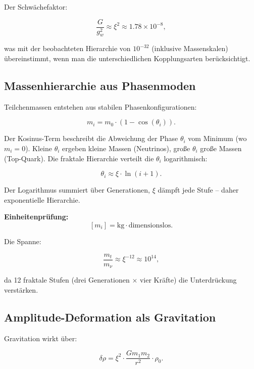 	Der Schwächefaktor:
	
	\begin{equation}
		\frac{G}{g_w^2} \approx \xi^2 \approx 1.78 \times 10^{-8},
	\end{equation}
	
	was mit der beobachteten Hierarchie von \(10^{-32}\) (inklusive Massenskalen) übereinstimmt, wenn man die unterschiedlichen Kopplungsarten berücksichtigt.
	
	\subsection*{Massenhierarchie aus Phasenmoden}
	
	Teilchenmassen entstehen aus stabilen Phasenkonfigurationen:
	
	\begin{equation}
		m_i = m_0 \cdot (1 - \cos(\theta_i)).
	\end{equation}
	
	Der Kosinus-Term beschreibt die Abweichung der Phase \(\theta_i\) vom Minimum (wo \(m_i = 0\)). Kleine \(\theta_i\) ergeben kleine Massen (Neutrinos), große \(\theta_i\) große Massen (Top-Quark). Die fraktale Hierarchie verteilt die \(\theta_i\) logarithmisch:
	
	\begin{equation}
		\theta_i \approx \xi \cdot \ln(i + 1).
	\end{equation}
	
	Der Logarithmus summiert über Generationen, \(\xi\) dämpft jede Stufe – daher exponentielle Hierarchie.
	
	\textbf{Einheitenprüfung:}
	\[
	[m_i] = \si{\kilo\gram} \cdot \text{dimensionslos}.
	\]
	
	Die Spanne:
	
	\begin{equation}
		\frac{m_t}{m_\nu} \approx \xi^{-12} \approx 10^{14},
	\end{equation}
	
	da 12 fraktale Stufen (drei Generationen × vier Kräfte) die Unterdrückung verstärken.
	
	\subsection*{Amplitude-Deformation als Gravitation}
	
	Gravitation wirkt über:
	
	\begin{equation}
		\delta \rho = \xi^2 \cdot \frac{G m_1 m_2}{r^2} \cdot \rho_0.
	\end{equation}
	
